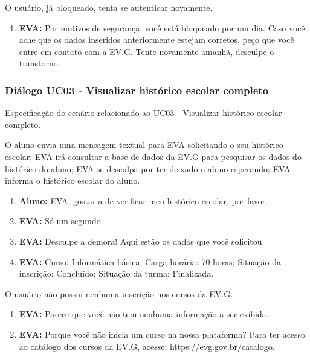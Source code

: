 O usuário, já bloqueado, tenta se autenticar novamente.

\begin{enumerate}[label=\alph*)]
        \tightlist
    \item \textbf{EVA:} Por motivos de segurança, você está bloqueado por um dia. Caso você ache que os dados inseridos anteriormente estejam corretos, peço que você entre em contato com a EV.G. Tente novamente amanhã, desculpe o transtorno.
\end{enumerate}

\subsubsection{Diálogo UC03 - Visualizar histórico escolar completo}

Especificação do cenário relacionado ao UC03 - Visualizar histórico escolar completo.

    
O aluno envia uma mensagem textual para EVA solicitando o seu histórico escolar; EVA irá consultar a base de dados da EV.G para pesquisar os dados do histórico do aluno; EVA se desculpa por ter deixado o aluno esperando; EVA informa o histórico escolar do aluno.
        
\begin{enumerate}[label=\alph*)]
        \tightlist
    \item \textbf{Aluno:} EVA, gostaria de verificar meu histórico escolar, por favor.
    \item \textbf{EVA:} Só um segundo.
    \item \textbf{EVA:} Desculpe a demora! Aqui estão os dados que você solicitou.
    \item \textbf{EVA:} Curso: Informática básica; Carga horária: 70 horas; Situação da inscrição: Concluído;
    Situação da turma: Finalizada.
\end{enumerate}
    
    
O usuário não possui nenhuma inscrição nos cursos da EV.G.
        
\begin{enumerate}[label=\alph*)]
        \tightlist
    \item \textbf{EVA:} Parece que você não tem nenhuma informação a ser exibida.
    \item \textbf{EVA:} Porque você não inicia um curso na nossa plataforma? Para ter acesso ao catálogo dos cursos da EV.G, acesse: https://evg.gov.br/catalogo.
\end{enumerate}
    
